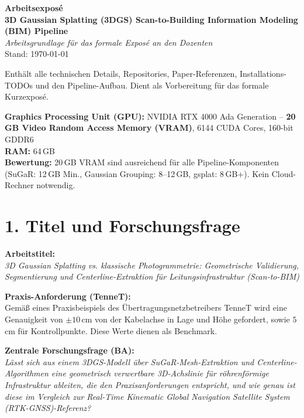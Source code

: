 \documentclass[11pt, a4paper]{article}
\begin{document}
\begin{center}
\textbf{\LARGE Arbeitsexpos\'e}\\[0.3em]
\textbf{\Large 3D Gaussian Splatting (3DGS) Scan-to-Building Information Modeling (BIM) Pipeline}\\[1em]
\textit{Arbeitsgrundlage f\"ur das formale Expos\'e an den Dozenten}\\[0.3em]
\small Stand: \today
\end{center}

\begin{tcolorbox}[colback=notebg, colframe=noteblue, title=\textbf{Zweck dieses Dokuments}]
Enth\"alt alle technischen Details, Repositories, Paper-Referenzen, Installations-TODOs und den Pipeline-Aufbau. Dient als Vorbereitung f\"ur das formale Kurzexpos\'e.
\end{tcolorbox}

\begin{tcolorbox}[colback=green!5, colframe=green!50!black, title=\textbf{Verf\"ugbare Hardware}]
\textbf{Graphics Processing Unit (GPU):} NVIDIA RTX 4000 Ada Generation -- \textbf{20\,GB Video Random Access Memory (VRAM)}, 6144 CUDA Cores, 160-bit GDDR6\\
\textbf{RAM:} 64\,GB\\
\textbf{Bewertung:} 20\,GB VRAM sind ausreichend f\"ur alle Pipeline-Komponenten (SuGaR: 12\,GB Min., Gaussian Grouping: 8--12\,GB, gsplat: 8\,GB+). Kein Cloud-Rechner notwendig.
\end{tcolorbox}

\section{1. Titel und Forschungsfrage}

\textbf{Arbeitstitel:}\\
\textit{3D Gaussian Splatting vs. klassische Photogrammetrie: Geometrische Validierung, Segmentierung und Centerline-Extraktion f\"ur Leitungsinfrastruktur (Scan-to-BIM)}

\textbf{Praxis-Anforderung (TenneT):}\\
Gem\"a\ss{} eines Praxisbeispiels des \"Ubertragungsnetzbetreibers TenneT wird eine Genauigkeit von $\pm 10$\,cm von der Kabelachse in Lage und H\"ohe gefordert, sowie $5$\,cm f\"ur Kontrollpunkte. Diese Werte dienen als Benchmark.

\textbf{Zentrale Forschungsfrage (BA):}\\
\textit{L\"asst sich aus einem 3DGS-Modell \"uber SuGaR-Mesh-Extraktion und Centerline-Algorithmen eine geometrisch verwertbare 3D-Achslinie f\"ur r\"ohrenf\"ormige Infrastruktur ableiten, die den Praxisanforderungen entspricht, und wie genau ist diese im Vergleich zur Real-Time Kinematic Global Navigation Satellite System (RTK-GNSS)-Referenz?}
\end{document}
